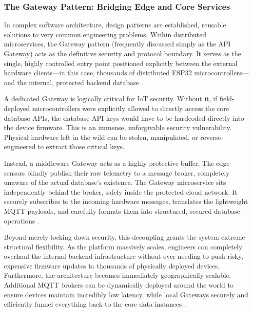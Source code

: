 \subsubsection{The Gateway Pattern: Bridging Edge and Core Services}

In complex software architecture, design patterns are established, reusable solutions to very common engineering problems. Within distributed microservices, the Gateway pattern (frequently discussed simply as the API Gateway) acts as the definitive security and protocol boundary. It serves as the single, highly controlled entry point positioned explicitly between the external hardware clients—in this case, thousands of distributed ESP32 microcontrollers—and the internal, protected backend database \cite{microservices_io_gateway, microservices_io_patterns, microservices_io_apigateway}.

A dedicated Gateway is logically critical for IoT security. Without it, if field-deployed microcontrollers were explicitly allowed to directly access the core database APIs, the database API keys would have to be hardcoded directly into the device firmware. This is an immense, unforgivable security vulnerability. Physical hardware left in the wild can be stolen, manipulated, or reverse-engineered to extract those critical keys. 

Instead, a middleware Gateway acts as a highly protective buffer. The edge sensors blindly publish their raw telemetry to a message broker, completely unaware of the actual database's existence. The Gateway microservice sits independently behind the broker, safely inside the protected cloud network. It securely subscribes to the incoming hardware messages, translates the lightweight MQTT payloads, and carefully formats them into structured, secured database operations \cite{microservices_io_apigateway}. 

Beyond merely locking down security, this decoupling grants the system extreme structural flexibility. As the platform massively scales, engineers can completely overhaul the internal backend infrastructure without ever needing to push risky, expensive firmware updates to thousands of physically deployed devices. Furthermore, the architecture becomes immediately geographically scalable. Additional MQTT brokers can be dynamically deployed around the world to ensure devices maintain incredibly low latency, while local Gateways securely and efficiently funnel everything back to the core data instances \cite{digitalapi_gateway_pattern, microservices_io_apigateway}. 

